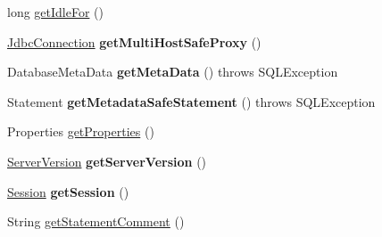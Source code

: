 \begin{DoxyCompactItemize}
\item 
long \mbox{\hyperlink{classcom_1_1mysql_1_1cj_1_1jdbc_1_1ha_1_1_multi_host_my_s_q_l_connection_a640187b96b3d091f9b74a927c754098c}{get\+Idle\+For}} ()
\item 
\mbox{\label{classcom_1_1mysql_1_1cj_1_1jdbc_1_1ha_1_1_multi_host_my_s_q_l_connection_a3ab2516b8f780cee30b02799846745e7}} 
\mbox{\hyperlink{interfacecom_1_1mysql_1_1cj_1_1jdbc_1_1_jdbc_connection}{Jdbc\+Connection}} {\bfseries get\+Multi\+Host\+Safe\+Proxy} ()
\item 
\mbox{\label{classcom_1_1mysql_1_1cj_1_1jdbc_1_1ha_1_1_multi_host_my_s_q_l_connection_a43aceadcc65d836e90179a00f8b7af6c}} 
Database\+Meta\+Data {\bfseries get\+Meta\+Data} ()  throws S\+Q\+L\+Exception 
\item 
\mbox{\label{classcom_1_1mysql_1_1cj_1_1jdbc_1_1ha_1_1_multi_host_my_s_q_l_connection_a62f8f7a723023f9bcda91b16ea300a3c}} 
Statement {\bfseries get\+Metadata\+Safe\+Statement} ()  throws S\+Q\+L\+Exception 
\item 
Properties \mbox{\hyperlink{classcom_1_1mysql_1_1cj_1_1jdbc_1_1ha_1_1_multi_host_my_s_q_l_connection_a4a717cb95caa93ac7469d50383e2882b}{get\+Properties}} ()
\item 
\mbox{\label{classcom_1_1mysql_1_1cj_1_1jdbc_1_1ha_1_1_multi_host_my_s_q_l_connection_aa2b70298f4e5d40fc09d7134ac25f6e3}} 
\mbox{\hyperlink{classcom_1_1mysql_1_1cj_1_1_server_version}{Server\+Version}} {\bfseries get\+Server\+Version} ()
\item 
\mbox{\label{classcom_1_1mysql_1_1cj_1_1jdbc_1_1ha_1_1_multi_host_my_s_q_l_connection_a656ba156c1e99bf0e9d0a2fd5c3cb646}} 
\mbox{\hyperlink{interfacecom_1_1mysql_1_1cj_1_1_session}{Session}} {\bfseries get\+Session} ()
\item 
String \mbox{\hyperlink{classcom_1_1mysql_1_1cj_1_1jdbc_1_1ha_1_1_multi_host_my_s_q_l_connection_ae92114d9d277c58982679012dccd1017}{get\+Statement\+Comment}} ()
\item 

\end{DoxyCompactItemize}
